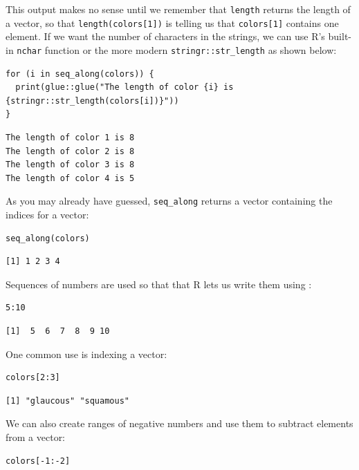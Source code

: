 This output makes no sense until we remember that \texttt{length} returns the length of a vector,
so that \texttt{length(colors[1])} is telling us that \texttt{colors[1]} contains one element.
If we want the number of characters in the strings,
we can use R's built-in \texttt{nchar} function or the more modern \texttt{stringr::str\_length}
as shown below:

\begin{lstlisting}
for (i in seq_along(colors)) {
  print(glue::glue("The length of color {i} is {stringr::str_length(colors[i])}"))
}
\end{lstlisting}

\begin{lstlisting}
The length of color 1 is 8
The length of color 2 is 8
The length of color 3 is 8
The length of color 4 is 5
\end{lstlisting}

As you may already have guessed,
\texttt{seq\_along} returns a vector containing the indices for a vector:

\begin{lstlisting}
seq_along(colors)
\end{lstlisting}

\begin{lstlisting}
[1] 1 2 3 4
\end{lstlisting}

Sequences of numbers are used so that
that R lets us write them using :

\begin{lstlisting}
5:10
\end{lstlisting}

\begin{lstlisting}
[1]  5  6  7  8  9 10
\end{lstlisting}

One common use is indexing a vector:

\begin{lstlisting}
colors[2:3]
\end{lstlisting}

\begin{lstlisting}
[1] "glaucous" "squamous"
\end{lstlisting}

We can also create ranges of negative numbers
and use them to subtract elements from a vector:

\begin{lstlisting}
colors[-1:-2]
\end{lstlisting}

